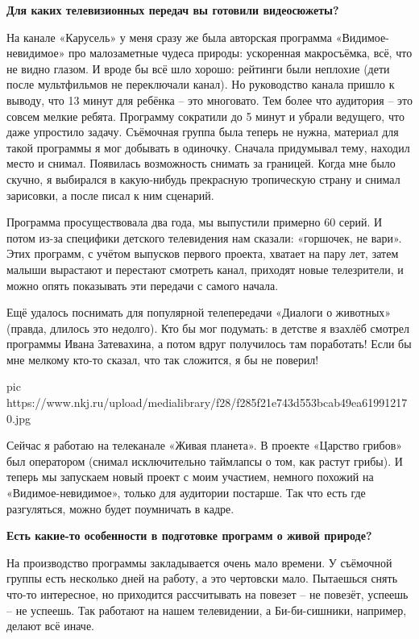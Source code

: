 \textbf{Для каких телевизионных передач вы готовили видеосюжеты?}

На канале «Карусель» у меня сразу же была авторская программа
«Видимое-невидимое» про малозаметные чудеса природы: ускоренная макросъёмка,
всё, что не видно глазом. И вроде бы всё шло хорошо: рейтинги были неплохие
(дети после мультфильмов не переключали канал). Но руководство канала пришло к
выводу, что 13 минут для ребёнка – это многовато. Тем более что аудитория – это
совсем мелкие ребята. Программу сократили до 5 минут и убрали ведущего, что
даже упростило задачу. Съёмочная группа была теперь не нужна, материал для
такой программы я мог добывать в одиночку. Сначала придумывал тему, находил
место и снимал. Появилась возможность снимать за границей. Когда мне было
скучно, я выбирался в какую-нибудь прекрасную тропическую страну и снимал
зарисовки, а после писал к ним сценарий.

Программа просуществовала два года, мы выпустили примерно 60 серий. И потом
из-за специфики детского телевидения нам сказали: «горшочек, не вари». Этих
программ, с учётом выпусков первого проекта, хватает на пару лет, затем малыши
вырастают и перестают смотреть канал, приходят новые телезрители, и можно опять
показывать эти передачи с самого начала.

Ещё удалось поснимать для популярной телепередачи «Диалоги о животных» (правда,
длилось это недолго). Кто бы мог подумать: в детстве я взахлёб смотрел
программы Ивана Затевахина, а потом вдруг получилось там поработать! Если бы
мне мелкому кто-то сказал, что так сложится, я бы не поверил! 

\ifcmt
pic https://www.nkj.ru/upload/medialibrary/f28/f285f21e743d553bcab49ea619912170.jpg
\fi

Сейчас я работаю на телеканале «Живая планета». В проекте «Царство грибов» был
оператором (снимал исключительно таймлапсы о том, как растут грибы). И теперь
мы запускаем новый проект с моим участием, немного похожий на
«Видимое-невидимое», только для аудитории постарше. Так что есть где
разгуляться, можно будет поумничать в кадре.

\textbf{Есть какие-то особенности в подготовке программ о живой природе?}

На производство программы закладывается очень мало времени. У съёмочной группы
есть несколько дней на работу, а это чертовски мало. Пытаешься снять что-то
интересное, но приходится рассчитывать на повезет – не повезёт, успеешь – не
успеешь. Так работают на нашем телевидении, а Би-би-сишники, например, делают
всё иначе.

